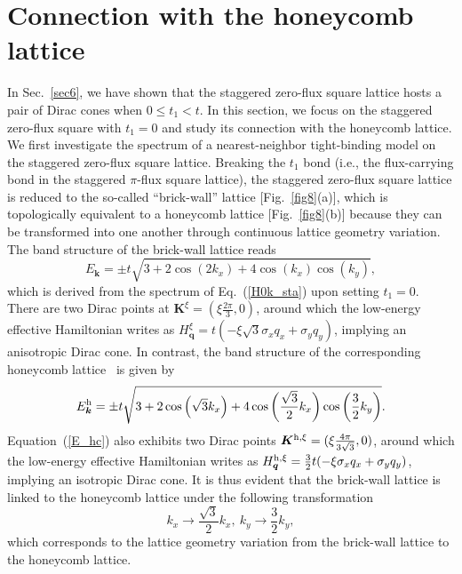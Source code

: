 \documentclass[aps, twocolumn, floatfix, superscriptaddress, prb]{revtex4-1}
\begin{document}
\section{Connection with the honeycomb lattice}
\label{sec7}
{In Sec.~\ref{sec6}, we have shown that the staggered zero-flux square lattice hosts a pair of Dirac cones when $0\leq t_1 <t$. In this section, we focus on the staggered zero-flux square with $t_1=0$ and study its connection with the honeycomb lattice. }
{We first investigate the spectrum of a nearest-neighbor tight-binding model on the staggered zero-flux square lattice. Breaking the $t_1$ bond (i.e., the flux-carrying bond in the staggered $\pi$-flux square lattice), the staggered zero-flux square lattice is reduced to the so-called ``brick-wall'' lattice [Fig.~\ref{fig8}(a)], which is topologically equivalent to a honeycomb lattice [Fig.~\ref{fig8}(b)] because they can be transformed into one another through continuous lattice geometry variation. The band structure of the brick-wall lattice reads}
%
\begin{equation}\label{E_bw}
  E_{\bm k}=\pm t\sqrt{3+2\cos(2k_x)+4\cos(k_x)\cos(k_y)},
\end{equation}
%
which is derived from the spectrum of Eq.~(\ref{H0k_sta}) upon setting $t_1=0$. There are two Dirac points at ${\bm K}^\xi=(\xi\frac{2\pi}{3},0)$, around which the low-energy effective Hamiltonian writes as $H^\xi_{\bm q}=t(-\xi\sqrt{3}\sigma_x q_x+\sigma_y q_y)$, implying an anisotropic Dirac cone. In contrast, the band structure of the corresponding honeycomb lattice~\cite{castroneto2009} is given by
%
\begin{equation}\label{E_hc}
  E^{\rm h}_{\bm k}=\pm t\sqrt{3+2\cos\left(\sqrt{3}k_x\right)+4\cos\left(\frac{\sqrt3}2k_x\right)\cos\left(\frac32k_y\right)}.
\end{equation}
%
Equation~(\ref{E_hc}) also exhibits two Dirac points $\bm K^{\text h,\xi}=(\xi\tfrac{4\pi}{3\sqrt 3},0)$, around which the low-energy effective Hamiltonian writes as $H^{\text h,\xi}_{\bm q}=\tfrac{3}{2}t(-\xi\sigma_x q_x+\sigma_y q_y)$, implying an isotropic Dirac cone. It is thus evident that the brick-wall lattice is linked to the honeycomb lattice under the following transformation
%
\begin{equation}\label{trans}
k_x\rightarrow\frac{\sqrt3}2k_x,\ k_y\rightarrow\frac32k_y,
\end{equation}
%
which corresponds to the lattice geometry variation from the brick-wall lattice to the honeycomb lattice.
\end{document}
